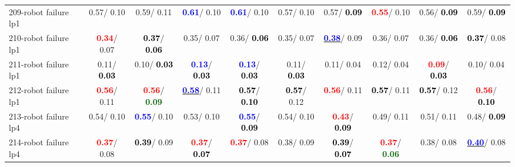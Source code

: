 \begin{table}[h]
\begin{center}
{\begin{tabular}{lc|c|c|c|c|c|c|c|c}
209-robot failure lp1 &   0.57/  0.10 &   0.59/  0.11 & \textcolor{blue}{\textbf{  0.61}}/  0.10 & \textcolor{blue}{\textbf{  0.61}}/  0.10 &   0.57/  0.10 &   0.57/\textcolor{black}{\textbf{  0.09}} & \textcolor{red}{\textbf{  0.55}}/  0.10 &   0.56/\textcolor{black}{\textbf{  0.09}} &   0.59/\textcolor{black}{\textbf{  0.09}} \\
210-robot failure lp1 & \textcolor{red}{\textbf{  0.34}}/  0.07 & \textcolor{black}{\textbf{  0.37}}/\textcolor{black}{\textbf{  0.06}} &   0.35/  0.07 &   0.36/\textcolor{black}{\textbf{  0.06}} &   0.35/  0.07 & \underline{\textcolor{blue}{\textbf{  0.38}}}/  0.09 &   0.36/  0.07 &   0.36/\textcolor{black}{\textbf{  0.06}} & \textcolor{black}{\textbf{  0.37}}/  0.08 \\
211-robot failure lp1 &   0.11/\textcolor{black}{\textbf{  0.03}} &   0.10/\textcolor{black}{\textbf{  0.03}} & \textcolor{blue}{\textbf{  0.13}}/\textcolor{black}{\textbf{  0.03}} & \textcolor{blue}{\textbf{  0.13}}/\textcolor{black}{\textbf{  0.03}} &   0.11/\textcolor{black}{\textbf{  0.03}} &   0.11/  0.04 &   0.12/  0.04 & \textcolor{red}{\textbf{  0.09}}/\textcolor{black}{\textbf{  0.03}} &   0.10/  0.04 \\
212-robot failure lp1 & \textcolor{red}{\textbf{  0.56}}/  0.11 & \textcolor{red}{\textbf{  0.56}}/\textcolor{darkgreen}{\textbf{  0.09}} & \underline{\textcolor{blue}{\textbf{  0.58}}}/  0.11 & \textcolor{black}{\textbf{  0.57}}/\textcolor{black}{\textbf{  0.10}} & \textcolor{black}{\textbf{  0.57}}/  0.12 & \textcolor{red}{\textbf{  0.56}}/  0.11 & \textcolor{black}{\textbf{  0.57}}/  0.11 & \textcolor{black}{\textbf{  0.57}}/  0.12 & \textcolor{red}{\textbf{  0.56}}/\textcolor{black}{\textbf{  0.10}} \\
213-robot failure lp4 &   0.54/  0.10 & \textcolor{blue}{\textbf{  0.55}}/  0.10 &   0.53/  0.10 & \textcolor{blue}{\textbf{  0.55}}/\textcolor{black}{\textbf{  0.09}} &   0.54/  0.10 & \textcolor{red}{\textbf{  0.43}}/\textcolor{black}{\textbf{  0.09}} &   0.49/  0.11 &   0.51/  0.11 &   0.48/\textcolor{black}{\textbf{  0.09}} \\ \hline
214-robot failure lp4 & \textcolor{red}{\textbf{  0.37}}/  0.08 & \textcolor{black}{\textbf{  0.39}}/  0.09 & \textcolor{red}{\textbf{  0.37}}/\textcolor{black}{\textbf{  0.07}} & \textcolor{red}{\textbf{  0.37}}/  0.08 &   0.38/  0.09 & \textcolor{black}{\textbf{  0.39}}/\textcolor{black}{\textbf{  0.07}} & \textcolor{red}{\textbf{  0.37}}/\textcolor{darkgreen}{\textbf{  0.06}} &   0.38/  0.08 & \underline{\textcolor{blue}{\textbf{  0.40}}}/  0.08 \\

\end{tabular}}
\end{center}
\end{table}
